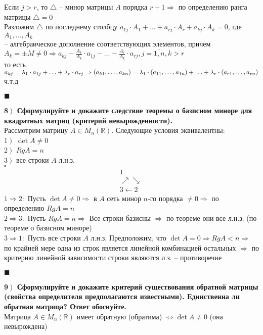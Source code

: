 \documentclass[a4paper,12pt]{article}
\newcommand*{\hm}[1]{#1\nobreak\discretionary{}
	{\hbox{$\mathsurround=0pt #1$}}{}}
\begin{document}
Если $j>r$, то $\triangle$ -- минор матрицы $A$ порядка $r+1\Rightarrow$ по определению ранга матрицы $\triangle=0$\\
Разложим $\triangle$ по последнему столбцу $a_{1j}\cdot A_1+\ldots+a_{rj}\cdot A_r+a_{kj}\cdot A_k=0$, где $A_1, \ldots, A_k$ \\-- алгебраическое дополнение соответствующих элементов, причем $A_k=\pm M\ne 0\Rightarrow a_{kj}-\frac{A_1}{A_k}\cdot a_{1j}-\ldots-\frac{A_r}{A_k}\cdot a_{rj}, j=\overline{1, n}, k>r$\\
то есть $a_{kj}=\lambda_1\cdot a_{1j}+\ldots+\lambda_r\cdot a_{rj}\Rightarrow(a_{k1}, \ldots, a_{kn})=\lambda_1\cdot(a_{11}, \ldots, a_{1n})\hm{+}\ldots+\lambda_r\cdot(a_{r1}, \ldots, a_{rn})$\\
ч.т.д
\begin{flushright}
	$\blacksquare$
\end{flushright}
\textbf{8$\left.\right)$ Сформулируйте и докажите следствие теоремы о базисном миноре для квадратных матриц (критерий невырожденности).}\\ Рассмотрим матрицу $A\in M_n(\mathbb{R})$. Следующие условия эквивалентны:\\
1$\left.\right)$ $\det A\ne 0$\\
2$\left.\right)$ $RgA=n$\\
3$\left.\right)$ все строки $A$ л.н.з.\\
$\square$\\
\[\begin{matrix}
&1&\\
&\nearrow\searrow&\\
&3\leftarrow2&
\end{matrix}\
\]
$1\Rightarrow2:$ Пусть $\det A\ne 0\Rightarrow$ в $A$ сеть минор $n$-го порядка $\ne0\Rightarrow$ по определению $RgA=n$\\
$2\Rightarrow3:$ Пусть $RgA=n\Rightarrow$ Все строки базисны $\Rightarrow$ по теореме они все л.н.з. (по теореме о базисном миноре)\\
$3\Rightarrow1:$ Пусть все строки $A$ л.н.з. Предположим, что $\det A=0\Rightarrow RgA<n\Rightarrow$ по крайней мере одна из строк является линейной комбинацией остальных $\Rightarrow$ по критерию линейной зависимости строки являются л.з. -- противоречие
\begin{flushright}
	$\blacksquare$
\end{flushright}
\textbf{9$\left.\right)$ Сформулируйте и докажите критерий существования обратной матрицы (свойства определителя предполагаются известными). Единственна ли обратная матрица? Ответ обоснуйте.}\\Матрица $A\in M_n(\mathbb{R})$ имеет обратную (обратима) $\Leftrightarrow\det A\ne0$ (она невырождена)\\
\end{document}
